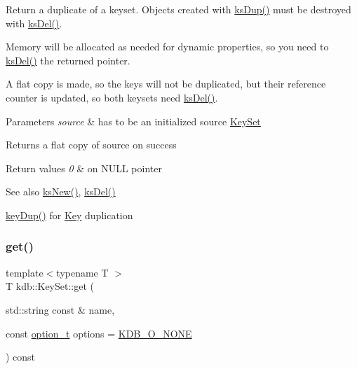 Return a duplicate of a keyset. Objects created with \mbox{\hyperlink{group__keyset_gac59e4b328245463f1451f68d5106151c}{ks\+Dup()}} must be destroyed with \mbox{\hyperlink{group__keyset_ga27e5c16473b02a422238c8d970db7ac8}{ks\+Del()}}.

Memory will be allocated as needed for dynamic properties, so you need to \mbox{\hyperlink{group__keyset_ga27e5c16473b02a422238c8d970db7ac8}{ks\+Del()}} the returned pointer.

A flat copy is made, so the keys will not be duplicated, but their reference counter is updated, so both keysets need \mbox{\hyperlink{group__keyset_ga27e5c16473b02a422238c8d970db7ac8}{ks\+Del()}}.


\begin{DoxyParams}{Parameters}
{\em source} & has to be an initialized source \mbox{\hyperlink{classkdb_1_1KeySet}{Key\+Set}} \\
\hline
\end{DoxyParams}
\begin{DoxyReturn}{Returns}
a flat copy of source on success 
\end{DoxyReturn}

\begin{DoxyRetVals}{Return values}
{\em 0} & on N\+U\+LL pointer \\
\hline
\end{DoxyRetVals}
\begin{DoxySeeAlso}{See also}
\mbox{\hyperlink{group__keyset_ga671e1aaee3ae9dc13b4834a4ddbd2c3c}{ks\+New()}}, \mbox{\hyperlink{group__keyset_ga27e5c16473b02a422238c8d970db7ac8}{ks\+Del()}} 

\mbox{\hyperlink{group__key_gae6ec6a60cc4b8c1463fa08623d056ce3}{key\+Dup()}} for \mbox{\hyperlink{group__key}{Key}} duplication 
\end{DoxySeeAlso}
\mbox{\label{classkdb_1_1KeySet_ad0b7d6498cf0b51ca6672704939a7f24}} 
\subsubsection{\texorpdfstring{get()}{get()}}
{\footnotesize\ttfamily template$<$typename T $>$ \\
T kdb\+::\+Key\+Set\+::get (\begin{DoxyParamCaption}\item[{std\+::string const \&}]{name,  }\item[{const \mbox{\hyperlink{group__keyset_ga98a3d6a4016c9dad9cbd1a99a9c2a45a}{option\+\_\+t}}}]{options = {\ttfamily \mbox{\hyperlink{group__keyset_gga98a3d6a4016c9dad9cbd1a99a9c2a45aa00738455e0ae843c8720809d8287f370}{K\+D\+B\+\_\+\+O\+\_\+\+N\+O\+NE}}} }\end{DoxyParamCaption}) const\hspace{0.3cm}{\ttfamily [inline]}}



